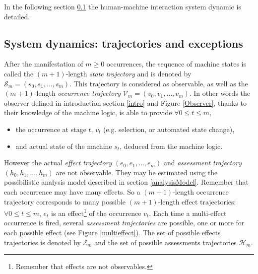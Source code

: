 In the following section \ref{sec:traj} 
the human-machine interaction system dynamic is detailed.


\subsection{System dynamics: trajectories and exceptions}
\label{sec:traj}
After the manifestation of $m \geqslant 0$ occurrences, 
the sequence of machine states is called the $(m+1)$-length 
\textit{state trajectory} and is denoted by 
$\mathcal{S}_m = (s_0,s_1,\ldots,s_m)$.
This trajectory is considered as observable, as well as the $(m+1)$-length 
\textit{occurrence trajectory} $\mathcal{V}_m = (v_0,v_1, \ldots, v_m)$.
In other words the observer defined in introduction section \ref{intro} 
and Figure \ref{Observer}, thanks to their 
knowledge of the machine logic, is able to provide
$\forall 0 \leqslant t \leqslant m$, 
\begin{itemize} 
\item the occurrence at stage $t$, $v_t$ (e.g. selection, or automated state change),
\item and actual state of the machine $s_t$, deduced from the machine logic.
\end{itemize}


However the actual \textit{effect trajectory} 
$(e_0,e_1,\ldots,e_m)$ and \textit{assessment trajectory} 
$(h_0,h_1,\ldots,h_m)$ are not observable. They may be estimated using 
the possibilistic analysis model described in section \ref{analysisModel}.
Remember that each occurrence may have many effects.
So a $(m+1)$-length occurrence trajectory corresponds 
to many possible $(m+1)$-length effect trajectories: 
$\forall 0 \leqslant t \leqslant m$, 
$e_t$ is an effect\footnote{Remember that effects are not observables.} of the occurrence $v_t$.
Each time a multi-effect occurrence is fired, several 
{\em assessment trajectories} are possible, one or more 
for each possible effect (see Figure \ref{multieffect}). The set of possible effects trajectories is denoted by $\mathcal{E}_m$ and the set of possible 
assessments trajectories $\mathcal{H}_m$.

